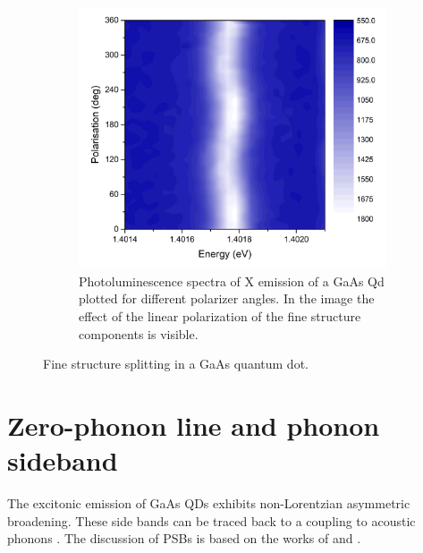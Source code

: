 \begin{figure}[H]
	\begin{subfigure}[b]{0.48\textwidth}
		\centering
		\includegraphics[width=1.05\textwidth]{figures/quantum-dot/FSS_Pol.png}
		\caption{Photoluminescence spectra of X emission of a GaAs Qd plotted for different polarizer angles.
			In the image the effect of the linear polarization of the fine structure components is visible.~\cite{schimpf_towards_2017}}
		\label{fig:fss-pol}
	\end{subfigure}
	\caption{Fine structure splitting in a GaAs quantum dot.}
	\label{fig:fss}
\end{figure}


\newpage
\section{Zero-phonon line and phonon sideband}
\label{sec:zero-phonon-side-band}
The excitonic emission of GaAs \acp{QD} exhibits non-Lorentzian asymmetric broadening.
These side bands can be traced back to a coupling to acoustic phonons \cite{peter_phonon_2004}\cite{reigue_probing_2017}.
The discussion of \acp{PSB} is based on the works of \textcite{friedrich_photochemical_1984} and  \textcite{peter_phonon_2004}.

